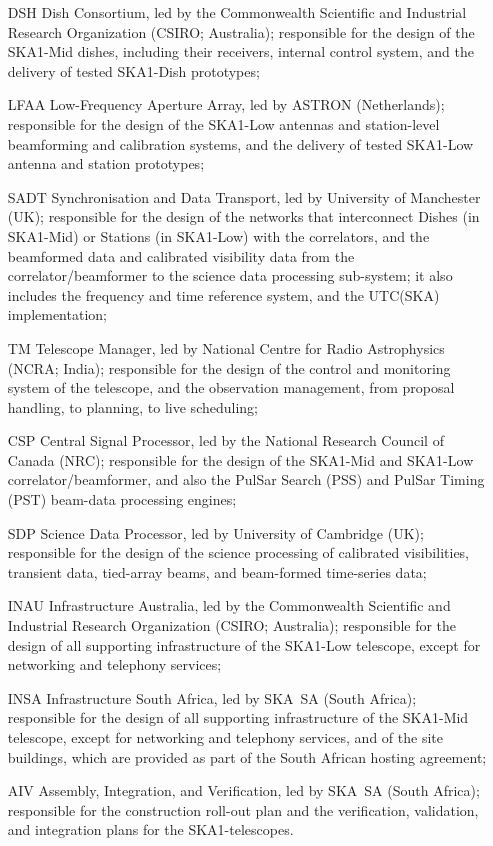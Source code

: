 \documentclass[a4paper,
               biblatex,       %
               keeplastbox,    %
               ]{jacow-2_1}    %
\begin{document}
\begin{itemize}
	\item[DSH] Dish Consortium, led by the Commonwealth Scientific and Industrial Research Organization (CSIRO; Australia); responsible for the design of the SKA1-Mid dishes, including their receivers, internal control system, and the delivery of tested SKA1-Dish prototypes;
	\item[LFAA] Low-Frequency Aperture Array, led by ASTRON (Netherlands); responsible for the design of the SKA1-Low antennas and station-level beamforming and calibration systems, and the delivery of tested SKA1-Low antenna and station prototypes;
	\item[SADT] Synchronisation and Data Transport, led by University of Manchester (UK); responsible for the design of the networks that interconnect Dishes (in SKA1-Mid) or Stations (in SKA1-Low) with the correlators, and the beamformed data and calibrated visibility data from the correlator/beamformer to the science data processing sub-system; it also includes the frequency and time reference system, and the UTC(SKA) implementation;
	\item[TM] Telescope Manager, led by National Centre for Radio Astrophysics (NCRA; India); responsible for the design of the control and monitoring system of the telescope, and the observation management, from proposal handling, to planning, to live scheduling;
	\item[CSP] Central Signal Processor, led by the National Research Council of Canada (NRC); responsible for the design of the SKA1-Mid and SKA1-Low correlator/beamformer, and also the PulSar Search (PSS) and PulSar Timing (PST) beam-data processing engines;
	\item[SDP] Science Data Processor, led by University of Cambridge (UK); responsible for the design of the science processing of calibrated visibilities, transient data, tied-array beams, and beam-formed time-series data;
	\item[INAU] Infrastructure Australia, led by the Commonwealth Scientific and Industrial Research Organization (CSIRO; Australia); responsible for the design of all supporting infrastructure of the SKA1-Low telescope, except for networking and telephony services;
	\item[INSA] Infrastructure South Africa, led by SKA~SA (South Africa); responsible for the design of all supporting infrastructure of the SKA1-Mid telescope, except for networking and telephony services, and of the site buildings, which are provided as part of the South African hosting agreement;
	\item[AIV] Assembly, Integration, and Verification, led by SKA~SA (South Africa); responsible for the construction roll-out plan and the verification, validation, and integration plans for the SKA1-telescopes.
\end{itemize}
\end{document}

